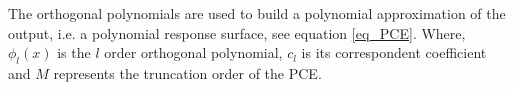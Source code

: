 \documentclass[preprint,12pt]{elsarticle}
\begin{document}
\begin{table}[h!]
\begin{center}
\caption{Classical orthogonal polynomial families.}
\label{tab_poly}
\end{center}
\end{table}








The orthogonal polynomials are used to build a polynomial approximation of the output, i.e. a polynomial response surface, see equation \ref{eq_PCE}. Where, $\phi_{l} (x)$ is the $l$ order orthogonal polynomial, $c_l$ is its correspondent coefficient and $M$ represents the truncation order of the PCE.
\end{document}

